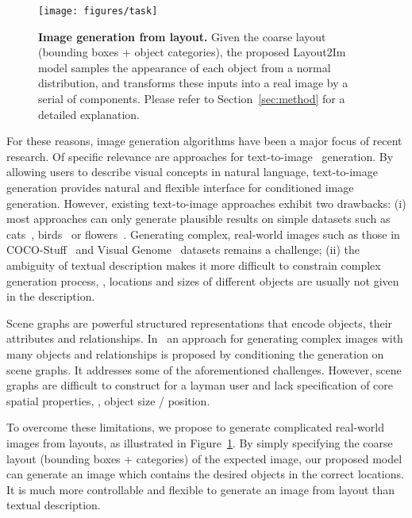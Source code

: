 \documentclass[10pt,twocolumn,letterpaper]{article}
\begin{document}
\begin{figure}[!t]
    \begin{center}
\texttt{[image: figures/task]}
    \end{center}
    \caption{{\bf Image generation from layout.} Given the coarse layout (bounding boxes + object categories), the proposed Layout2Im model samples the appearance of each object from a normal distribution, and transforms these inputs into a real image by a serial of components. Please refer to Section~\ref{sec:method} for a detailed explanation.}
\label{fig:task_example}
\end{figure}

For these reasons, image generation algorithms have been a major focus of recent research. Of specific relevance are approaches for text-to-image~\cite{hong2018inferring, karacan2016learning, mansimov2015generating, reed2017parallel,tan2018text2scene,zhang2017stackgan} generation. 
By allowing users to describe visual concepts in natural language, text-to-image generation provides natural and flexible interface for conditioned image generation.
However, existing text-to-image approaches exhibit two drawbacks: (i) most approaches can only generate plausible results on simple datasets such as cats~\cite{Zhang2008}, birds~\cite{WelinderEtal2010} or flowers~\cite{flowers}. Generating complex, real-world images such as those in COCO-Stuff~\cite{caesar2016coco} and Visual Genome~\cite{krishna2017visual} datasets remains a challenge; (ii) the ambiguity of textual description makes it more difficult to constrain complex generation process, \eg, locations and sizes of different objects are usually not given in the description. 

Scene graphs are powerful structured representations that encode objects, their attributes and relationships. In~\cite{Johnson2018} an approach for generating complex images with many objects and relationships is proposed by conditioning the generation on scene graphs. It addresses some of the aforementioned challenges. However, scene graphs are difficult to construct for a layman user and lack specification of core spatial properties, \eg, object size / position.





To overcome these limitations, we propose to generate complicated real-world images from layouts, as illustrated in Figure~\ref{fig:task_example}. By simply specifying the coarse layout (bounding boxes + categories) of the expected image, our proposed model can generate an image which contains the desired objects in the correct locations. It is much more controllable and flexible to generate an image from layout than textual description.
\end{document}

